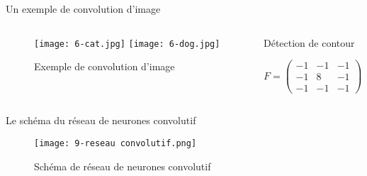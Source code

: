 \begin{frame}{Un exemple de convolution d'image}
    \begin{columns}[T] %
        \begin{column}{.6\textwidth}
            \begin{figure}
                \texttt{[image: 6-cat.jpg]}
                \texttt{[image: 6-dog.jpg]}
                \caption[]{Exemple de convolution d'image}
            \end{figure}
        \end{column}
        \begin{column}{0.35\textwidth}
            \begin{exampleblock}{Détection de contour}
                \begin{center}
                    \centering
                    $
                        F =
                        \begin{pmatrix}
                            -1 & -1 & -1 \\
                            -1 & 8  & -1 \\
                            -1 & -1 & -1
                        \end{pmatrix}
                    $
                \end{center}
            \end{exampleblock}
        \end{column}
    \end{columns}
\end{frame}


\begin{frame}{Le schéma du réseau de neurones convolutif}
    \begin{figure}
        \texttt{[image: 9-reseau convolutif.png]}
        \caption[]{Schéma de réseau de neurones convolutif}
    \end{figure}
\end{frame}
